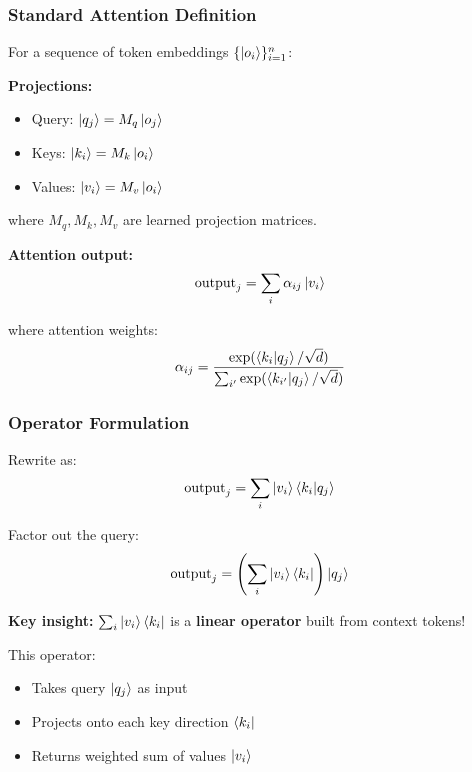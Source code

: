 \documentclass[11pt,a4paper]{article}
\theoremstyle{definition}
\begin{document}
\subsubsection{Standard Attention Definition}

For a sequence of token embeddings $\{\ket{o_i}\}_{i=1}^n$:

\textbf{Projections:}
\begin{itemize}
\item Query: $\ket{q_j} = M_q \ket{o_j}$
\item Keys: $\ket{k_i} = M_k \ket{o_i}$
\item Values: $\ket{v_i} = M_v \ket{o_i}$
\end{itemize}

where $M_q, M_k, M_v$ are learned projection matrices.

\textbf{Attention output:}
\begin{equation}
\text{output}_j = \sum_i \alpha_{ij} \ket{v_i}
\end{equation}

where attention weights:
\begin{equation}
\alpha_{ij} = \frac{\exp(\braket{k_i|q_j} / \sqrt{d})}{\sum_{i'} \exp(\braket{k_{i'}|q_j} / \sqrt{d})}
\end{equation}

\subsubsection{Operator Formulation}

Rewrite as:
\begin{equation}
\text{output}_j = \sum_i \ket{v_i} \braket{k_i|q_j}
\end{equation}

Factor out the query:
\begin{equation}
\text{output}_j = \left(\sum_i \ket{v_i} \bra{k_i}\right) \ket{q_j}
\end{equation}

\textbf{Key insight:} $\sum_i \ket{v_i} \bra{k_i}$ is a \textbf{linear operator} built from context tokens!

This operator:
\begin{itemize}
\item Takes query $\ket{q_j}$ as input
\item Projects onto each key direction $\bra{k_i}$
\item Returns weighted sum of values $\ket{v_i}$
\end{itemize}
\end{document}
